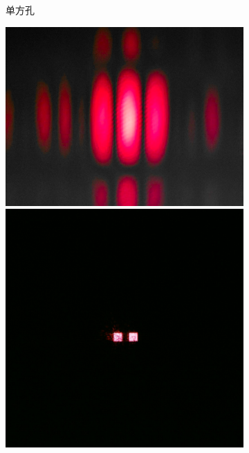 \documentclass[a4paper]{article}
\begin{document}
\begin{figure}[H]
\begin{subfigure}[t]{0.3\textwidth}
        \caption{单方孔}
        \label{1-1}
    \end{subfigure}
    \begin{subfigure}[t]{0.3\textwidth}
        \centering
        \includegraphics[width=\textwidth]{fre-done/1-2.JPG}
        \includegraphics[width=\textwidth]{img-done/1-2.JPG}

\end{subfigure}
\end{figure}
\end{document}
